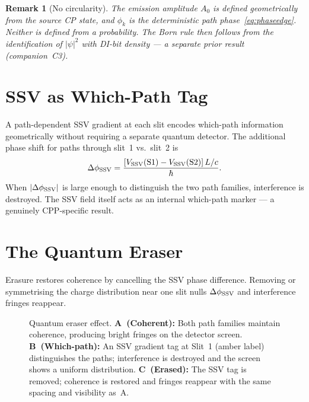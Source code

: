 \documentclass[11pt,a4paper]{article}
\newtheorem{remark}[theorem]{Remark}
\begin{document}
\begin{remark}[No circularity]
The emission amplitude $A_0$ is defined geometrically from the source
CP state, and $\phi_k$ is the deterministic path phase~\eqref{eq:phaseedge}.
Neither is defined from a probability.  The Born rule then follows from
the identification of $|\psi|^2$ with DI-bit density --- a separate
prior result (companion~C3).
\end{remark}

\section{SSV as Which-Path Tag}

A path-dependent SSV gradient at each slit encodes which-path
information geometrically without requiring a separate quantum detector.
The additional phase shift for paths through slit~1 vs.\ slit~2 is
\begin{equation}
\Delta\phi_{\rm SSV}
= \frac{[V_{\rm SSV}({\rm S1}) - V_{\rm SSV}({\rm S2})]\,L/c}{\hbar}.
\label{eq:ssvphase}
\end{equation}
When $|\Delta\phi_{\rm SSV}|$ is large enough to distinguish the two
path families, interference is destroyed.  The SSV field itself acts
as an internal which-path marker --- a genuinely CPP-specific result.

\section{The Quantum Eraser}

Erasure restores coherence by cancelling the SSV phase difference.
Removing or symmetrising the charge distribution near one slit nulls
$\Delta\phi_{\rm SSV}$ and interference fringes reappear.

\begin{figure}[H]
\centering

\caption{Quantum eraser effect.
  \textbf{A~(Coherent):} Both path families maintain coherence,
  producing bright fringes on the detector screen.
  \textbf{B~(Which-path):} An SSV gradient tag at Slit~1
  (amber label) distinguishes the paths; interference is destroyed
  and the screen shows a uniform distribution.
  \textbf{C~(Erased):} The SSV tag is removed; coherence is restored
  and fringes reappear with the same spacing and visibility as~A.}
\label{fig:eraser}
\end{figure}
\end{document}

